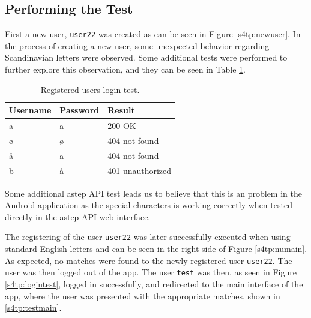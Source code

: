 \subsection{Performing the Test}
First a new user, \texttt{user22} was created as can be seen in Figure \ref{s4tp:newuser}.
In the process of creating a new user, some unexpected behavior regarding Scandinavian letters were observed.
Some additional tests were performed to further explore this observation, and they can be seen in Table \ref{tab:logintest}.
\begin{table}[!ht]
	\centering
	\begin{tabular}{@{}lll@{}}
		Username & Password & Result \\
		\hline
		a & a & 200 OK\\
		ø & ø & 404 not found\\
		å & a & 404 not found\\
		b & å & 401 unauthorized\\
	\end{tabular}
	\caption{Registered users login test.}
	\label{tab:logintest}
\end{table}

Some additional \gls{astep} API test leads us to believe that this is an problem in the Android application as the special characters is working correctly when tested directly in the \gls{astep} API web interface.

The registering of the user \texttt{user22} was later successfully executed when using standard English letters and can be seen in the right side of Figure \ref{s4tp:numain}. 
As expected, no matches were found to the newly registered user \texttt{user22}. 
The user was then logged out of the app.
The user \texttt{test} was then, as seen in Figure \ref{s4tp:logintest}, logged in successfully, and redirected to the main interface of the app, where the user was presented with the appropriate matches, shown in \ref{s4tp:testmain}.


